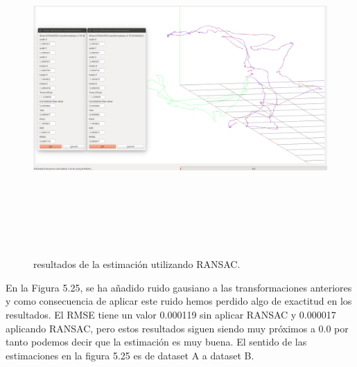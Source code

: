 \begin{figure}
\begin{center}
\label{fig:opciones de View}\includegraphics[height=12.0cm,width=18.0cm]{img/cap6/newData_EscalaTraslaRotaGauss_ab.png}
\hspace{0.5cm}

\end{center}

\caption{ resultados de la estimación  utilizando RANSAC.}
\end{figure}
En la Figura 5.25, se ha añadido ruido gausiano a las transformaciones anteriores y como consecuencia de aplicar este ruido hemos perdido algo de exactitud en los resultados. 
El RMSE tiene un valor 0.000119 sin aplicar RANSAC y 0.000017 aplicando RANSAC, pero estos resultados siguen siendo muy próximos a 0.0 por tanto podemos decir que la estimación es muy buena.
El sentido de las estimaciones en la figura 5.25 es de dataset A a dataset B.



